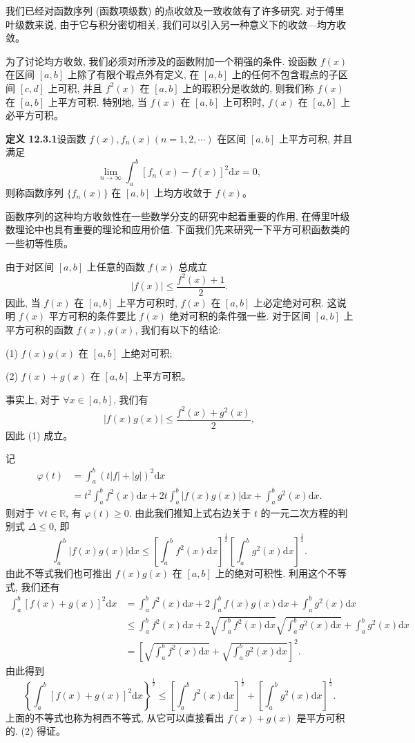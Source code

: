 \documentclass[UTF8,12pt,a4paper,fontset=fandol]{ctexart}
\begin{document}
我们已经对函数序列 (函数项级数) 的点收敛及一致收敛有了许多研究. 对于傅里叶级数来说, 由于它与积分密切相关, 我们可以引入另一种意义下的收敛---均方收敛。

为了讨论均方收敛, 我们必须对所涉及的函数附加一个稍强的条件. 设函数 $f(x)$ 在区间 $[a,b]$ 上除了有限个瑕点外有定义, 在 $[a,b]$ 上的任何不包含瑕点的子区间 $[c,d]$ 上可积, 并且 $f^2(x)$ 在 $[a,b]$ 上的瑕积分是收敛的, 则我们称 $f(x)$ 在 $[a,b]$ 上平方可积. 特别地, 当 $f(x)$ 在 $[a,b]$ 上可积时, $f(x)$ 在 $[a,b]$ 上必平方可积。

\noindent\textbf{定义 12.3.1}\quad 设函数 $f(x),f_n(x)(n=1,2,\cdots)$ 在区间 $[a,b]$ 上平方可积, 并且满足
\[
  \lim_{n\to\infty}\int_a^b[f_n(x)-f(x)]^2\mathrm dx=0,
\]
则称函数序列 $\{f_n(x)\}$ 在 $[a,b]$ 上均方收敛于 $f(x)$。

函数序列的这种均方收敛性在一些数学分支的研究中起着重要的作用, 在傅里叶级数理论中也具有重要的理论和应用价值. 下面我们先来研究一下平方可积函数类的一些初等性质。

由于对区间 $[a,b]$ 上任意的函数 $f(x)$ 总成立
\[
  |f(x)|\leqslant\frac{f^2(x)+1}{2}.
\]
因此, 当 $f(x)$ 在 $[a,b]$ 上平方可积时, $f(x)$ 在 $[a,b]$ 上必定绝对可积. 这说明 $f(x)$ 平方可积的条件要比 $f(x)$ 绝对可积的条件强一些. 对于区间 $[a,b]$ 上平方可积的函数 $f(x),g(x)$, 我们有以下的结论:

(1) $f(x)g(x)$ 在 $[a,b]$ 上绝对可积;

(2) $f(x)+g(x)$ 在 $[a,b]$ 上平方可积。

事实上, 对于 $\forall x\in[a,b]$, 我们有
\[
  |f(x)g(x)|\leqslant\frac{f^2(x)+g^2(x)}{2},
\]
因此 (1) 成立。

记
\[
\begin{aligned}
  \varphi(t)
  &=\int_a^b(t|f|+|g|)^2\mathrm dx\\
  &=t^2\int_a^bf^2(x)\mathrm dx
    +2t\int_a^b|f(x)g(x)|\mathrm dx
    +\int_a^bg^2(x)\mathrm dx.
\end{aligned}
\]
则对于 $\forall t\in\mathbb R$, 有 $\varphi(t)\geqslant0$. 由此我们推知上式右边关于 $t$ 的一元二次方程的判别式 $\Delta\leqslant0$, 即
\[
  \int_a^b|f(x)g(x)|\mathrm dx
  \leqslant
  \left[\int_a^bf^2(x)\mathrm dx\right]^{\frac12}
  \left[\int_a^bg^2(x)\mathrm dx\right]^{\frac12}.
\]
由此不等式我们也可推出 $f(x)g(x)$ 在 $[a,b]$ 上的绝对可积性. 利用这个不等式, 我们还有
\[
\begin{aligned}
  \int_a^b[f(x)+g(x)]^2\mathrm dx
  &=\int_a^bf^2(x)\mathrm dx+2\int_a^bf(x)g(x)\mathrm dx+\int_a^bg^2(x)\mathrm dx\\
  &\leqslant\int_a^bf^2(x)\mathrm dx
    +2\sqrt{\int_a^bf^2(x)\mathrm dx}\sqrt{\int_a^bg^2(x)\mathrm dx}
    +\int_a^bg^2(x)\mathrm dx\\
  &=\left[
    \sqrt{\int_a^bf^2(x)\mathrm dx}
    +\sqrt{\int_a^bg^2(x)\mathrm dx}
  \right]^2.
\end{aligned}
\]
由此得到
\[
  \left\{\int_a^b[f(x)+g(x)]^2\mathrm dx\right\}^{\frac12}
  \leqslant
  \left[\int_a^bf^2(x)\mathrm dx\right]^{\frac12}
  +
  \left[\int_a^bg^2(x)\mathrm dx\right]^{\frac12}.
\]
上面的不等式也称为柯西不等式, 从它可以直接看出 $f(x)+g(x)$ 是平方可积的. (2) 得证。
\end{document}
